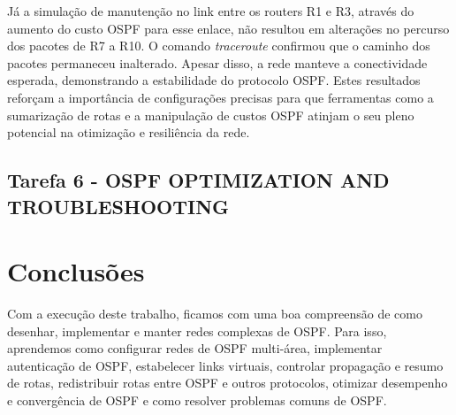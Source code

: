 \documentclass[11pt,english, openright, oneside]{book}
\begin{document}
\par Já a simulação de manutenção no link entre os routers R1 e R3, através do aumento do custo OSPF para esse enlace, não resultou em alterações no percurso dos pacotes de R7 a R10. O comando \textit{traceroute} confirmou que o caminho dos pacotes permaneceu inalterado. Apesar disso, a rede manteve a conectividade esperada, demonstrando a estabilidade do protocolo OSPF. Estes resultados reforçam a importância de configurações precisas para que ferramentas como a sumarização de rotas e a manipulação de custos OSPF atinjam o seu pleno potencial na otimização e resiliência da rede.

\pagebreak

\section{Tarefa 6 - OSPF OPTIMIZATION AND TROUBLESHOOTING}
\vspace{0.2cm}

\pagebreak

\chapter{Conclusões}

Com a execução deste trabalho, ficamos com uma boa compreensão de como desenhar, implementar e manter redes complexas de OSPF. Para isso, aprendemos como configurar redes de OSPF multi-área, implementar autenticação de OSPF, estabelecer links virtuais, controlar propagação e resumo de rotas, redistribuir rotas entre OSPF e outros protocolos, otimizar desempenho e convergência de OSPF e como resolver problemas comuns de OSPF. 



\pagebreak

\mainmatter
\end{document}
